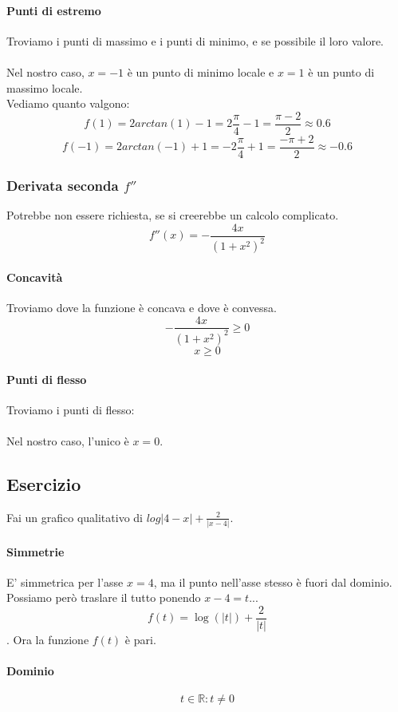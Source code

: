 \documentclass{article}
\begin{document}
\paragraph{Punti di estremo}
Troviamo i punti di massimo e i punti di minimo, e se possibile il loro valore.\\\\
Nel nostro caso, \(x = -1\) è un punto di minimo locale e \(x = 1\) è un punto di massimo locale.\\
Vediamo quanto valgono:
\[f(1) = 2 arctan(1) - 1 = 2 \frac{\pi}{4} - 1 = \frac{\pi - 2}{2} \approx 0.6\]
\[f(-1) = 2 arctan(-1) + 1 = - 2 \frac{\pi}{4} + 1 = \frac{- \pi + 2}{2} \approx -0.6\]

\subsubsection{Derivata seconda \(f''\)}
Potrebbe non essere richiesta, se si creerebbe un calcolo complicato.
\[f''(x) = -\frac{4x}{(1 + x^2)^2}\]

\paragraph{Concavità}
Troviamo dove la funzione è concava e dove è convessa.\\
\[-\frac{4x}{(1 + x^2)^2} \geq 0\]
\[x \geq 0\]

\paragraph{Punti di flesso}
Troviamo i punti di flesso:\\\\
Nel nostro caso, l'unico è \(x = 0\).

\subsection{Esercizio}
Fai un grafico qualitativo di \(log | 4 - x | + \frac{2}{|x - 4|}\).

\paragraph{Simmetrie}
E' simmetrica per l'asse \(x = 4\), ma il punto nell'asse stesso è fuori dal dominio.
Possiamo però traslare il tutto ponendo \(x - 4 = t\)...
\[f(t) = \log(|t|) + \frac{2}{|t|}\].
Ora la funzione \(f(t)\) è pari.

\paragraph{Dominio}
\[{t \in \mathbb{R} : t \neq 0}\]
\end{document}
